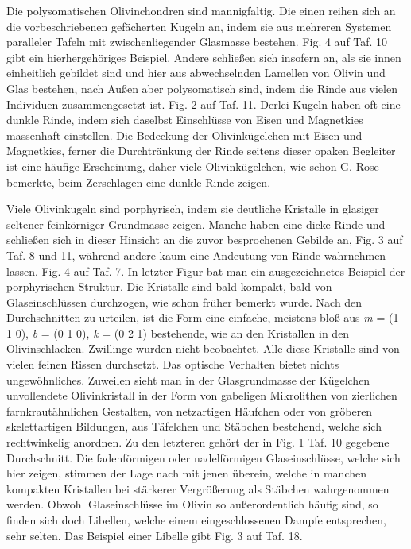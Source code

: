 \documentclass[a4paper, 12pt, oneside]{article}
\begin{document}
Die polysomatischen Olivinchondren sind mannigfaltig. Die einen reihen sich an die vorbeschriebenen gefächerten Kugeln an, indem sie aus mehreren Systemen paralleler Tafeln mit zwischenliegender Glasmasse bestehen. Fig. 4 auf Taf. 10 gibt ein hierhergehöriges Beispiel. Andere schließen sich insofern an, als sie innen einheitlich gebildet sind und hier aus abwechselnden Lamellen von Olivin und Glas bestehen, nach Außen aber polysomatisch sind, indem die Rinde aus vielen Individuen zusammengesetzt ist. Fig. 2 auf Taf. 11. Derlei Kugeln haben oft eine dunkle Rinde, indem sich daselbst Einschlüsse von Eisen und Magnetkies massenhaft einstellen. Die Bedeckung der Olivinkügelchen mit Eisen und Magnetkies, ferner die Durchtränkung der Rinde seitens dieser opaken Begleiter ist eine häufige Erscheinung, daher viele Olivinkügelchen, wie schon G. Rose bemerkte, beim Zerschlagen eine dunkle Rinde zeigen.

Viele Olivinkugeln sind porphyrisch, indem sie deutliche Kristalle in glasiger seltener feinkörniger Grundmasse zeigen. Manche haben eine dicke Rinde und schließen sich in dieser Hinsicht an die zuvor besprochenen Gebilde an, Fig. 3 auf Taf. 8 und 11, während andere kaum eine Andeutung von Rinde wahrnehmen lassen. Fig. 4 auf Taf. 7. In letzter Figur bat man ein ausgezeichnetes Beispiel der porphyrischen Struktur. Die Kristalle sind bald kompakt, bald von Glaseinschlüssen durchzogen, wie schon früher bemerkt wurde. Nach den Durchschnitten zu urteilen, ist die Form eine einfache, meistens bloß aus \emph{m} = (1 1 0), \emph{b} = (0 1 0), \emph{k} = (0 2 1) bestehende, wie an den Kristallen in den Olivinschlacken. Zwillinge wurden nicht beobachtet. Alle diese Kristalle sind von vielen feinen Rissen durchsetzt. Das optische Verhalten bietet nichts ungewöhnliches. Zuweilen sieht man in der Glasgrundmasse der Kügelchen unvollendete Olivinkristall in der Form von gabeligen Mikrolithen von zierlichen farnkrautähnlichen Gestalten, von netzartigen Häufchen oder von gröberen skelettartigen Bildungen, aus Täfelchen und Stäbchen bestehend, welche sich rechtwinkelig anordnen. Zu den letzteren gehört der in Fig. 1 Taf. 10 gegebene Durchschnitt. Die fadenförmigen oder nadelförmigen Glaseinschlüsse, welche sich hier zeigen, stimmen der Lage nach mit jenen überein, welche in manchen kompakten Kristallen bei stärkerer Vergrößerung als Stäbchen wahrgenommen werden. Obwohl Glaseinschlüsse im Olivin so außerordentlich häufig sind, so finden sich doch Libellen, welche einem eingeschlossenen Dampfe entsprechen, sehr selten. Das Beispiel einer Libelle gibt Fig. 3 auf Taf. 18.
\end{document}
